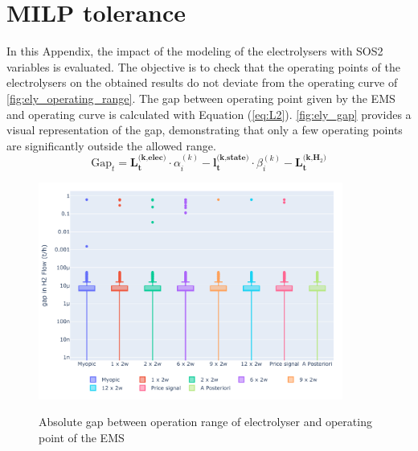 \section{MILP tolerance} \label{app:MILP}
In this Appendix, the impact of the modeling of the electrolysers with SOS2 variables is evaluated. The objective is to check that the operating points of the electrolysers on the obtained results do not deviate from the operating curve of \autoref{fig:ely_operating_range}. The gap between operating point given by the EMS and operating curve is calculated with Equation (\ref{eq:L2}). \autoref{fig:ely_gap} provides a visual representation of the gap, demonstrating that only a few operating points are significantly outside the allowed range. 
\begin{equation*}
     \text{Gap}_t = \textbf{L}_\textbf{t}^{\textbf{(k,elec)}} \cdot \alpha_i^{(k)} - \textbf{l}_\textbf{t}^{\textbf{(k,state)}} \cdot \beta_i^{(k)} - \textbf{L}_\textbf{t}^{\textbf{(k,H$_2$)}}
\end{equation*}

\begin{figure}
    \centering
    \includegraphics[width=10cm]{02_Appendix/MILP_tolerance_boxplot.pdf}\\
    \caption{Absolute gap between operation range of electrolyser and operating point of the EMS}
    \label{fig:ely_gap}
\end{figure} 